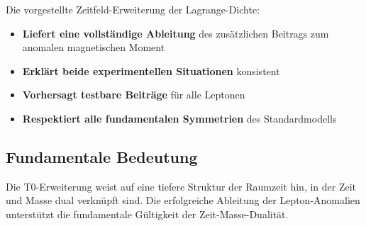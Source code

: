 \documentclass[12pt,a4paper]{article}
\theoremstyle{definition}
\begin{document}
	Die vorgestellte Zeitfeld-Erweiterung der Lagrange-Dichte:
	
	\begin{itemize}
		\item \textbf{Liefert eine vollständige Ableitung} des zusätzlichen Beitrags zum anomalen magnetischen Moment
		\item \textbf{Erklärt beide experimentellen Situationen} konsistent
		\item \textbf{Vorhersagt testbare Beiträge} für alle Leptonen
		\item \textbf{Respektiert alle fundamentalen Symmetrien} des Standardmodells
	\end{itemize}
	
	\subsection{Fundamentale Bedeutung}
	
	Die T0-Erweiterung weist auf eine tiefere Struktur der Raumzeit hin, in der Zeit und Masse dual verknüpft sind. Die erfolgreiche Ableitung der Lepton-Anomalien unterstützt die fundamentale Gültigkeit der Zeit-Masse-Dualität.
	
\end{document}
